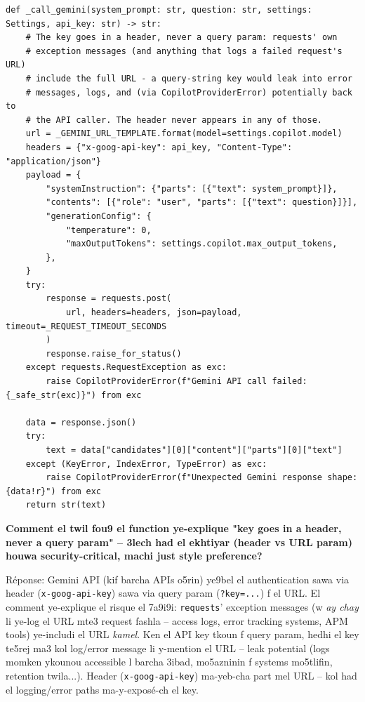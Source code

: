 \documentclass[11pt,a4paper]{report}
\DeclareRobustCommand{\code}[1]{\texttt{#1}}
\begin{document}
\begin{lstlisting}[style=pystyle]
def _call_gemini(system_prompt: str, question: str, settings: Settings, api_key: str) -> str:
    # The key goes in a header, never a query param: requests' own
    # exception messages (and anything that logs a failed request's URL)
    # include the full URL - a query-string key would leak into error
    # messages, logs, and (via CopilotProviderError) potentially back to
    # the API caller. The header never appears in any of those.
    url = _GEMINI_URL_TEMPLATE.format(model=settings.copilot.model)
    headers = {"x-goog-api-key": api_key, "Content-Type": "application/json"}
    payload = {
        "systemInstruction": {"parts": [{"text": system_prompt}]},
        "contents": [{"role": "user", "parts": [{"text": question}]}],
        "generationConfig": {
            "temperature": 0,
            "maxOutputTokens": settings.copilot.max_output_tokens,
        },
    }
    try:
        response = requests.post(
            url, headers=headers, json=payload, timeout=_REQUEST_TIMEOUT_SECONDS
        )
        response.raise_for_status()
    except requests.RequestException as exc:
        raise CopilotProviderError(f"Gemini API call failed: {_safe_str(exc)}") from exc

    data = response.json()
    try:
        text = data["candidates"][0]["content"]["parts"][0]["text"]
    except (KeyError, IndexError, TypeError) as exc:
        raise CopilotProviderError(f"Unexpected Gemini response shape: {data!r}") from exc
    return str(text)
\end{lstlisting}

\begin{soual}
\textbf{Comment el twil fou9 el function ye-explique "key goes in a
header, never a query param" -- 3lech had el ekhtiyar (header vs URL
param) houwa security-critical, machi just style preference?}

Réponse: Gemini API (kif barcha APIs o5rin) ye9bel el authentication
sawa via header (\code{x-goog-api-key}) sawa via query param
(\code{?key=...}) f el URL. El comment ye-explique el risque el 7a9i9i:
\code{requests}' exception messages (w \emph{ay chay} li ye-log el
URL mte3 request fashla -- access logs, error tracking systems, APM
tools) ye-includi el URL \emph{kamel}. Ken el API key tkoun f query
param, hedhi el key te5rej ma3 kol log/error message li y-mention el
URL -- leak potential (logs momken ykounou accessible l barcha 3ibad,
mo5azninin f systems mo5tlifin, retention twila...). Header
(\code{x-goog-api-key}) ma-yeb-cha part mel URL -- kol had el logging/error
paths ma-y-exposé-ch el key.
\end{soual}
\end{document}
